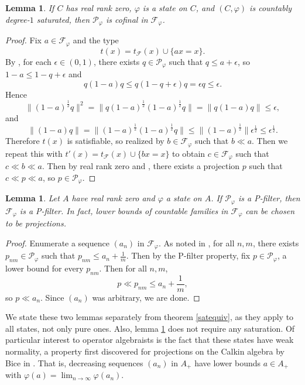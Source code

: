 \documentclass[10pt]{amsart}
\newtheorem{lem}[thm]{Lemma}
\theoremstyle{definition}
\newcommand{\tF}{t_\mathscr{F}(x)}
\newcommand{\Fp}{\mathscr{F}_\varphi}
\newcommand{\Pp}{\mathscr{P}_\varphi}
\begin{document}
\begin{lem}\label{cof}
    If $C$ has real rank zero, $\varphi$ is a state on $C$, and $(C,\varphi)$ is countably degree-$1$ saturated, then $\Pp$ is cofinal in $\Fp$.
\end{lem}

\begin{proof}
    Fix $a\in\Fp$ and the type
    \[t(x)=\tF\cup \{ax=x\}.\]
    By \cite[5.3.10]{FA19}, for each $\epsilon\in(0,1)$, there exists $q\in\Pp$ such that $q\leq a+\epsilon$, so $1-a\leq 1-q+\epsilon$ and
    \[q(1-a)q\leq q(1-q+\epsilon)q=\epsilon q\leq\epsilon.\]
    Hence
    \[\|(1-a)^\frac{1}{2}q\|^2=\|q(1-a)^\frac{1}{2}(1-a)^\frac{1}{2}q\|=\|q(1-a)q\|\leq\epsilon,\]
    and
    \[\|(1-a)q\|=\|(1-a)^\frac{1}{2}(1-a)^\frac{1}{2}q\|\leq\|(1-a)^\frac{1}{2}\|\epsilon^\frac{1}{2}\leq\epsilon^\frac{1}{2}.\]
    Therefore $t(x)$ is satisfiable, so realized by $b\in\Fp$ such that $b\ll a$. Then we repeat this with $t'(x)=\tF\cup\{bx=x\}$ to obtain $c\in\Fp$ such that $c\ll b\ll a$. Then by real rank zero and \cite[2.7.5]{FA19}, there exists a projection $p$ such that $c\ll p\ll a$, so $p\in\Pp$.
\end{proof}

\begin{lem}\label{psig}
    Let $A$ have real rank zero and $\varphi$ a state on $A$.
    If $\Pp$ is a P-filter, then $\Fp$ is a P-filter. In fact, lower bounds of countable families in $\Fp$ can be chosen to be projections.
\end{lem}

\begin{proof}
    Enumerate a sequence $(a_n)$ in $\Fp$. As noted in \cite[5.3.10]{FA19}, for all $n,m$, there exists $p_{nm}\in\Pp$ such that $p_{nm}\leq a_n+\frac{1}{m}$. Then by the P-filter property, fix $p\in\Pp$, a lower bound for every $p_{nm}$. Then for all $n,m$,
    \[p\ll p_{nm}\leq a_n+\frac{1}{m},\]
    so $p\ll a_n$. Since $(a_n)$ was arbitrary, we are done.
\end{proof}

We state these two lemmas separately from theorem \ref{satequiv}, as they apply to all states, not only pure ones. Also, lemma \ref{psig} does not require any saturation. Of particular interest to operator algebraists is the fact that these states have weak normality, a property first discovered for projections on the Calkin algebra by Bice in \cite[6.2]{BI13}. That is, decreasing sequences $(a_n)$ in $A_+$ have lower bounds $a\in A_+$ with $\varphi(a)=\lim_{n\rightarrow\infty}\varphi(a_n)$.
\end{document}
